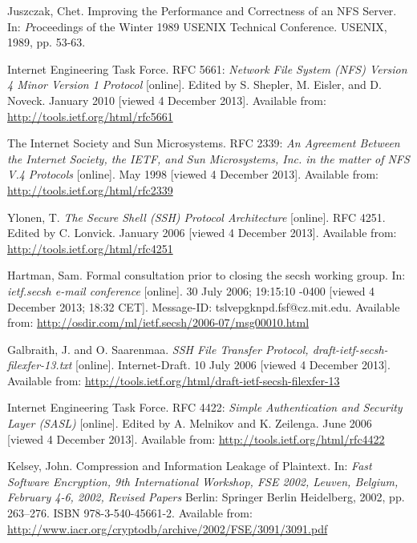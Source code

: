 \begin{thebibliography}{99}
	{\sc Juszczak,} Chet.
	Improving the Performance and Correctness of an NFS Server.
	In: {\emph Proceedings of the Winter 1989 USENIX Technical Conference}.
	USENIX, 1989, pp. 53-63.

	{\sc Internet Engineering Task Force}.
	RFC 5661:
	\emph{Network File System (NFS) Version 4 Minor Version 1 Protocol}
	[online].
	Edited by S. Shepler, M. Eisler, and D. Noveck.
	January 2010 [viewed 4 December 2013].
	Available from: \url{http://tools.ietf.org/html/rfc5661}

	{\sc The Internet Society} and {\sc Sun Microsystems}.
	RFC 2339:
	\emph{An Agreement Between the Internet Society, the IETF, and Sun Microsystems, Inc. in the matter of NFS V.4 Protocols}
	[online].
	May 1998 [viewed 4 December 2013].
	Available from: \url{http://tools.ietf.org/html/rfc2339}

	{\sc Ylonen,} T.
	\emph{The Secure Shell (SSH) Protocol Architecture}
	[online].
	RFC 4251.
	Edited by C. Lonvick.
	January 2006 [viewed 4 December 2013].
	Available from: \url{http://tools.ietf.org/html/rfc4251}

	{\sc Hartman,} Sam.
	Formal consultation prior to closing the secsh working group.
	In: \emph{ietf.secsh e-mail conference}
	[online].
	30 July 2006; 19:15:10 -0400 [viewed 4 December 2013; 18:32 CET].
	Message-ID: tslvepgknpd.fsf@cz.mit.edu.
	Available from: \url{http://osdir.com/ml/ietf.secsh/2006-07/msg00010.html}

	{\sc Galbraith,} J. and O. {\sc Saarenmaa}.
	\emph{SSH File Transfer Protocol, draft-ietf-secsh-filexfer-13.txt}
	[online].
	Internet-Draft.
	10 July 2006 [viewed 4 December 2013].
	Available from: \url{http://tools.ietf.org/html/draft-ietf-secsh-filexfer-13}


	{\sc Internet Engineering Task Force}.
	RFC 4422:
	\emph{Simple Authentication and Security Layer (SASL)}
	[online].
	Edited by A. Melnikov and K. Zeilenga.
	June 2006 [viewed 4 December 2013].
	Available from: \url{http://tools.ietf.org/html/rfc4422}

	{\sc Kelsey,} John.
	Compression and Information Leakage of Plaintext.
	In: \emph{Fast Software Encryption, 9th International Workshop, FSE 2002,
	Leuven, Belgium, February 4-6, 2002, Revised Papers}
	Berlin: Springer Berlin Heidelberg, 2002, pp. 263--276.
	ISBN 978-3-540-45661-2.
	Available from: \url{http://www.iacr.org/cryptodb/archive/2002/FSE/3091/3091.pdf}


\end{thebibliography}
